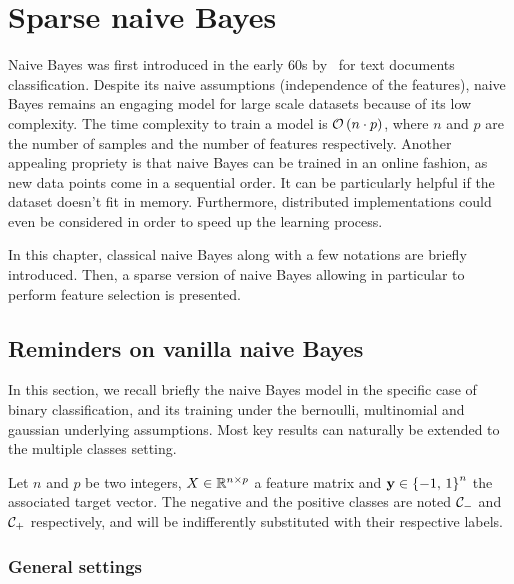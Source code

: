 \chapter{Sparse naive Bayes}\label{ch:snb}

Naive Bayes was first introduced in the early 60s by~\cite{original_naive_bayes} for text documents classification.
Despite its naive assumptions (independence of the features),
naive Bayes remains an engaging model for large scale datasets because of its low complexity.
The time complexity to train a model is $\mathcal{O}\left( n \cdot p \right)$, where $n$ and $p$ are the number of
samples and the number of features respectively.
Another appealing propriety is that naive Bayes can be trained in an online fashion,
as new data points come in a sequential order.
It can be particularly helpful if the dataset doesn't fit in memory.
Furthermore, distributed implementations could even be considered in order to speed up the learning process.

In this chapter, classical naive Bayes along with a few notations are briefly introduced.
Then, a sparse version of naive Bayes allowing in particular to perform feature selection is presented.

\section{Reminders on vanilla naive Bayes}\label{sec:naive_bayes}

In this section, we recall briefly the naive Bayes model in the specific case of binary classification,
and its training under the bernoulli, multinomial and gaussian underlying assumptions.
Most key results can naturally be extended to the multiple classes setting.

Let $n$ and $p$ be two integers, $X \in \mathbb{R}^{n \times p}$ a feature matrix
and $\mathbf{y} \in \left\{ -1,\, 1 \right\}^n$ the associated target vector.
The negative and the positive classes are noted $\mathcal{C}_-$ and $\mathcal{C}_+$ respectively,
and will be indifferently substituted with their respective labels.

\subsection{General settings}\label{subsec:nb_general}

